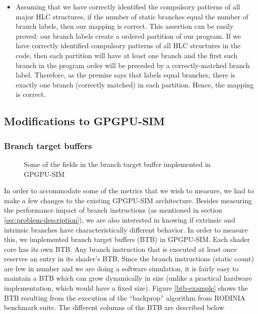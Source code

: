 \begin{itemize}
	\item Assuming that we have correctly identified the compulsory patterns of all major HLC structures, if the number of static branches equal the number of branch labels, then our mapping is correct.
 This assertion can be easily proved: our branch labels create a ordered partition of our program. If we have correctly identified compulsory patterns of all HLC structures in the code, then each partition will have at least one branch and the first such branch in the program order will be preceded by a correctly-matched branch label. Therefore, as the premise says that labels equal branches, there is exactly one branch (correctly matched) in each partition. Hence, the mapping is correct. 
\end{itemize}

\subsection{Modifications to GPGPU-SIM}
	\subsubsection*{Branch target buffers}
	\begin{figure*}
		
		\caption{Some of the fields in the branch target buffer implemented in GPGPU-SIM
			\label{fig:btb-example}}
	\end{figure*}
	\par{In order to accommodate some of the metrics that we wish to measure, we had to make a few changes to the existing GPGPU-SIM architecture. Besides measuring the performance impact of branch instructions (as mentioned in section \ref{sec:problem-description}), we are also interested in knowing if extrinsic and intrinsic branches have characteristically different behavior. In order to measure this, we implemented branch target buffers (BTB) in GPGPU-SIM. Each shader core has its own BTB. Any branch instruction that is executed at least once reserves an entry in its shader's BTB. Since the branch instructions (static count) are few in number and we are doing a software simulation, it is fairly easy to maintain a BTB which can grow dynamically in size (unlike a practical hardware implementation, which would have a fixed size). Figure \ref{btb-example} shows the BTB resulting from the execution of the ``backprop'' algorithm from RODINIA benchmark suite. The different columns of the BTB are described below}

